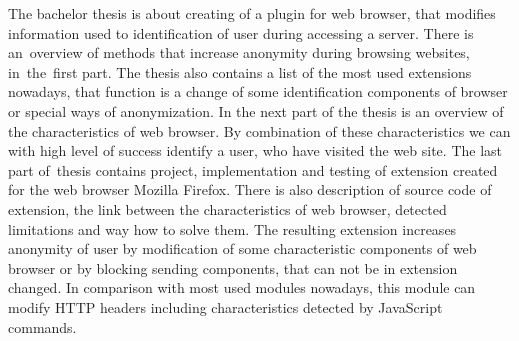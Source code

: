 The bachelor thesis is about creating of a plugin for web browser, that modifies information used to identification of user during accessing a server. There is an~overview of methods that increase anonymity during browsing websites, in~the~first part. The thesis also contains a list of the most used extensions nowadays, that function is a change of some identification components of browser or special ways of anonymization. In the next part of the thesis is an overview of the characteristics of web browser. By combination of these characteristics we can with high level of success identify a user, who have visited the web site. The last part of~thesis contains project, implementation and testing of extension created for the web browser Mozilla Firefox. There is also description of source code of extension, the link between the characteristics of web browser, detected limitations and way how to solve them. The resulting extension increases anonymity of user by modification of some characteristic components of web browser or by blocking sending components, that can not be in extension changed. In comparison with most used modules nowadays, this module can modify HTTP headers including characteristics detected by JavaScript commands.